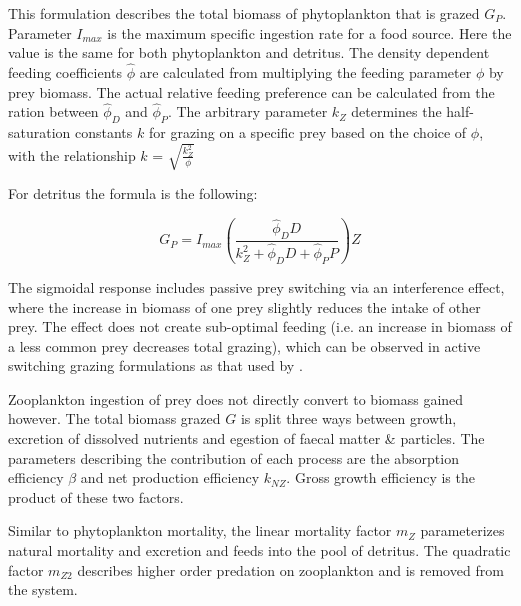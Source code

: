\documentclass[journal abbreviation, manuscript]{copernicus}
\begin{document}
This formulation describes the total biomass of phytoplankton that is grazed $G_P$. Parameter $I_{max}$ is the maximum specific ingestion rate for a food source. Here the value is the same for both phytoplankton and detritus. The density dependent feeding coefficients $\hat{\phi}$ are calculated from multiplying the feeding parameter $\phi$ by prey biomass. The actual relative feeding preference can be calculated from the ration between $\hat{\phi}_D$ and $\hat{\phi}_P$. The arbitrary parameter $k_Z$ determines the half-saturation constants $k$ for grazing on a specific prey based on the choice of $\phi$, with the relationship $k$ = $\sqrt{\frac{k^2_Z }{ \phi}}$

For detritus the formula is the following:

\begin{equation}
    G_P = I_{max} \left( \frac{ \hat{\phi}_D D}{k_Z^2 + \hat{\phi}_D D +\hat{\phi}_P P}  \right) Z
\end{equation}

The sigmoidal response includes passive prey switching via an interference effect, where the increase in biomass of one prey slightly reduces the intake of other prey. The effect does not create sub-optimal feeding (i.e. an increase in biomass of a less common prey decreases total grazing), which can be observed in active switching grazing formulations as that used by \citet{Fasham1990a}.

Zooplankton ingestion of prey does not directly convert to biomass gained however. The total biomass grazed $G$ is split three ways between growth, excretion of dissolved nutrients and egestion of faecal matter \& particles. The parameters describing the contribution of each process are the absorption efficiency $\beta$ and net production efficiency $k_{NZ}$. Gross growth efficiency is the product of these two factors.  

Similar to phytoplankton mortality, the linear mortality factor $m_Z$ parameterizes natural mortality and excretion and feeds into the pool of detritus. The quadratic factor $m_{Z2}$ describes higher order predation on zooplankton and is removed from the system.
\end{document}
